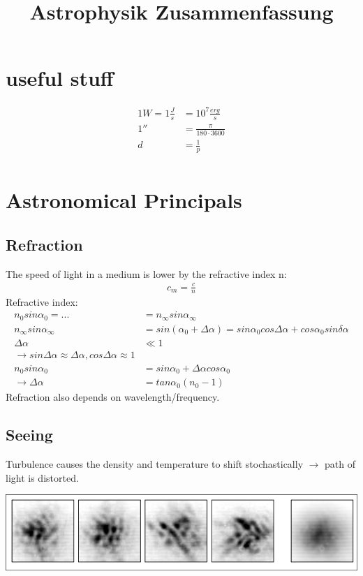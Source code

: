 \documentclass[11pt,a4paper]{article}
\begin{document}
\title{Astrophysik Zusammenfassung}

\author{}

\date{}

\maketitle

\tableofcontents

\newpage


\section{useful stuff}
\begin{align*}
    1 W = 1 \frac J s &= 10^7 \frac {erg} s \\
    1'' &= \frac \pi {180 \cdot 3600}\\ 
    d &= \frac 1 p \\
\end{align*}
\section{Astronomical Principals}
\subsection{Refraction}
The speed of light in a medium is lower by the refractive index n:
\begin{align*}
   c_m = \frac c n 
\end{align*}
Refractive index: 
\begin{align*}
    n_0 sin \alpha_0 = ... &= n_\infty sin \alpha_\infty \\ 
    n_\infty sin \alpha_\infty &= sin (\alpha_0 + \Delta \alpha) = sin \alpha_0 cos \Delta \alpha + cos \alpha_0 sin \delta \alpha\\ 
    \Delta \alpha &\ll 1  \\ 
    \rightarrow sin \Delta \alpha \approx \Delta \alpha, cos \Delta \alpha \approx 1 \\ 
    n_0 sin \alpha_0 &= sin \alpha_0 + \Delta \alpha cos \alpha_0 \\ 
    \rightarrow \Delta \alpha &= tan \alpha_0 (n_0 - 1)
\end{align*}
Refraction also depends on wavelength/frequency.
\subsection{Seeing}
Turbulence causes the density and temperature to shift stochastically $\rightarrow$ path of light is distorted.
\begin{center}
    \includegraphics[width=\linewidth]{screenshot_2024-01-12-192223.png}
\end{center}
\end{document}
